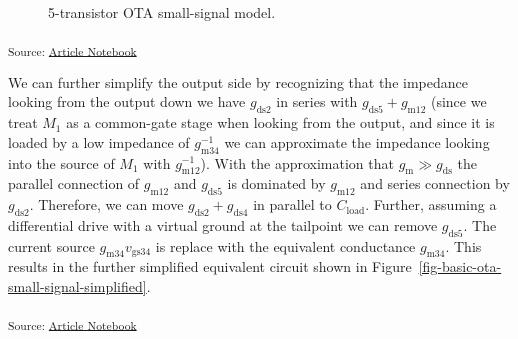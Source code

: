 \documentclass[
  a4paper,
  DIV=11,
  numbers=noendperiod]{scrartcl}
\begin{document}
\begin{figure}[H]


\caption{\label{fig-basic-ota-small-signal}5-transistor OTA small-signal
model.}

\end{figure}%

\textsubscript{Source:
\href{https://iic-jku.github.io/analog-circuit-design/index.qmd.html}{Article
Notebook}}

We can further simplify the output side by recognizing that the
impedance looking from the output down we have \(g_\mathrm{ds2}\) in
series with \(g_\mathrm{ds5} + g_\mathrm{m12}\) (since we treat \(M_1\)
as a common-gate stage when looking from the output, and since it is
loaded by a low impedance of \(g_\mathrm{m34}^{-1}\) we can approximate
the impedance looking into the source of \(M_1\) with
\(g_\mathrm{m12}^{-1}\)). With the approximation that
\(g_\mathrm{m}\gg g_\mathrm{ds}\) the parallel connection of
\(g_\mathrm{m12}\) and \(g_\mathrm{ds5}\) is dominated by
\(g_\mathrm{m12}\) and series connection by \(g_\mathrm{ds2}\).
Therefore, we can move \(g_\mathrm{ds2} + g_\mathrm{ds4}\) in parallel
to \(C_\mathrm{load}\). Further, assuming a differential drive with a
virtual ground at the tailpoint we can remove \(g_\mathrm{ds5}\). The
current source \(g_\mathrm{m34} v_\mathrm{gs34}\) is replace with the
equivalent conductance \(g_\mathrm{m34}\). This results in the further
simplified equivalent circuit shown in
Figure~\ref{fig-basic-ota-small-signal-simplified}.

\textsubscript{Source:
\href{https://iic-jku.github.io/analog-circuit-design/index.qmd.html}{Article
Notebook}}
\end{document}
